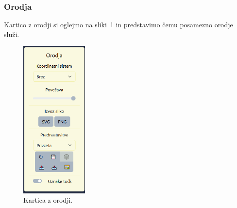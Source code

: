 \documentclass[isrm2, tisk]{fmfdelo}
\begin{document}
    \subsubsection{Orodja}
    Kartico z orodji si oglejmo na sliki~\ref{fig:bezeg:kartica-z-orodji} in predstavimo čemu posamezno orodje služi.
    \begin{figure}[h]
        \centering
        \includegraphics[width = 0.30\textwidth]{images/bezeg/orodja}
        \caption{Kartica z orodji.}
        \label{fig:bezeg:kartica-z-orodji}
    \end{figure}
\end{document}
